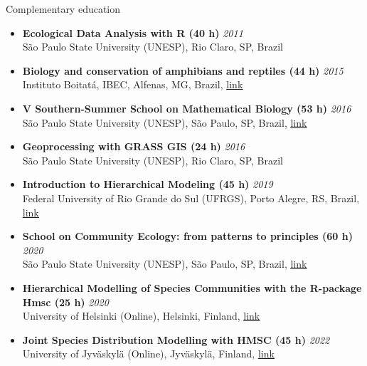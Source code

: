 \documentclass{resume}
\begin{document}
\begin{rSection}{Complementary education}

\begin{itemize} 

\item \textbf{Ecological Data Analysis with R (40 h)} \hfill {\em 2011}\\
São Paulo State University (UNESP), Rio Claro, SP, Brazil

\item \textbf{Biology and conservation of amphibians and reptiles (44 h)} \hfill {\em 2015}\\
Instituto Boitatá, IBEC, Alfenas, MG, Brazil, \href{https://www.institutoboitata.org/}{\underline{link}}

\item \textbf{V Southern-Summer School on Mathematical Biology (53 h)} \hfill {\em 2016}\\
São Paulo State University (UNESP), São Paulo, SP, Brazil, \href{https://www.ictp-saifr.org/v-southern-summer-school-on-mathematical-biology}{\underline{link}} 

\item \textbf{Geoprocessing with GRASS GIS (24 h)} \hfill {\em 2016}\\
São Paulo State University (UNESP), Rio Claro, SP, Brazil

\item \textbf{Introduction to Hierarchical Modeling (45 h)} \hfill {\em 2019}\\
Federal University of Rio Grande do Sul (UFRGS), Porto Alegre, RS, Brazil, \href{http://ferrazlab.org/graduate}{\underline{link}}

\item \textbf{School on Community Ecology: from patterns to principles (60 h)} \hfill {\em 2020}\\
São Paulo State University (UNESP), São Paulo, SP, Brazil, \href{https://www.ictp-saifr.org/community-ecology-from-patterns-to-principles}{\underline{link}}

\item \textbf{Hierarchical Modelling of Species Communities with the R-package Hmsc (25 h)} \hfill {\em 2020}\\
University of Helsinki (Online), Helsinki, Finland, \href{https://www.helsinki.fi/en/researchgroups/statistical-ecology/hmsc}{\underline{link}}

\item \textbf{Joint Species Distribution Modelling with HMSC (45 h)} \hfill {\em 2022}\\
University of Jyväskylä (Online), Jyväskylä, Finland, \href{https://www.helsinki.fi/en/researchgroups/statistical-ecology/software/hmsc}{\underline{link}}


\end{itemize}
\end{rSection}
\end{document}
